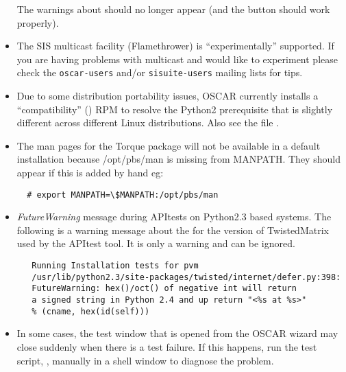 \begin{itemize}
  The warnings about  should no longer appear (and the
   button should work properly).

\item The SIS multicast facility (Flamethrower) is ``experimentally''
  supported.  If you are having problems with multicast and would like
  to experiment please check the {\tt oscar-users} and/or
  {\tt sisuite-users} mailing lists for tips.

\item Due to some distribution portability issues, OSCAR currently installs
  a ``compatibility''  () RPM to resolve the
  Python2 prerequisite that is slightly different across different Linux
  distributions.  Also see the file .

\item The man pages for the Torque package will not be available in
  a default installation because /opt/pbs/man is missing from
  MANPATH.  They should appear if this is added by hand eg:

\begin{verbatim}
  # export MANPATH=\$MANPATH:/opt/pbs/man
\end{verbatim}

\item \emph{FutureWarning} message during APItests on Python2.3 based systems.
   The following is a warning message about the for the version of
   TwistedMatrix used by the APItest tool.  It is only a warning and can be
   ignored.
   \begin{small}
   \begin{verbatim}
   Running Installation tests for pvm
   /usr/lib/python2.3/site-packages/twisted/internet/defer.py:398:
   FutureWarning: hex()/oct() of negative int will return
   a signed string in Python 2.4 and up return "<%s at %s>" 
   % (cname, hex(id(self)))
   \end{verbatim}
   \end{small}

\item In some cases, the test window that is opened from the
  OSCAR wizard may close suddenly when there is a test failure. If
  this happens, run the test script, ,
  manually in a shell window to diagnose the problem.


\end{itemize}
